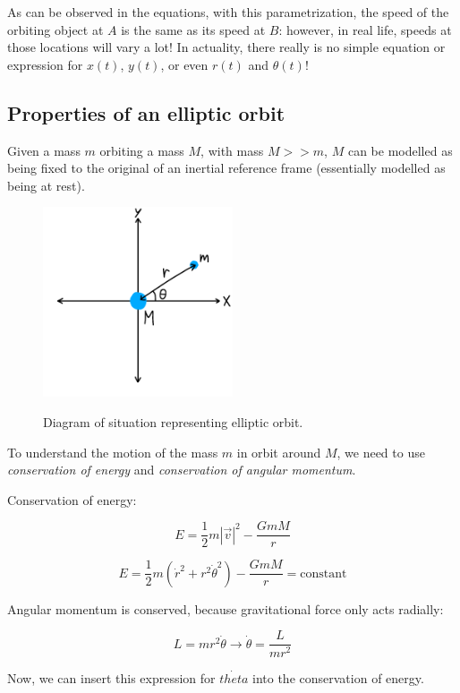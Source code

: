 \documentclass[12pt]{article}
\begin{document}
As can be observed in the equations, with this parametrization, the speed of the orbiting object at $A$ is the same as its speed at $B$: however, in real life, speeds at those locations will vary a lot!
In actuality, there really is no simple equation or expression for $x(t)$, $y(t)$, or even $r(t)$ and $\theta (t)$!

\newpage

\subsection{Properties of an elliptic orbit}

Given a mass $m$ orbiting a mass $M$, with mass $M >> m$, $M$ can be modelled as being fixed to the original of an inertial reference frame (essentially modelled as being at rest).

\begin{figure}[h]
    \centering
    \includegraphics[width=0.5\textwidth]{polar_coord}
    \label{fig:polarcoord}
    \caption{Diagram of situation representing elliptic orbit.}
\end{figure}

To understand the motion of the mass $m$ in orbit around $M$, we need to use \emph{conservation of energy} and \emph{conservation of angular momentum}.

Conservation of energy:

\[
E = \frac{1}{2}m\left| \vec{v} \right|^2 - \frac{GmM}{r}
\]

\[
E = \frac{1}{2}m\left( \dot{r}^2 + r^2 \dot{\theta}^2 \right) - \frac{GmM}{r} = \text{constant}
\]

Angular momentum is conserved, because gravitational force only acts radially:

\[
L = mr^2\dot{\theta} \longrightarrow \dot{\theta} = \frac{L}{mr^2}
\]

Now, we can insert this expression for $\dot{theta}$ into the conservation of energy.
\end{document}
